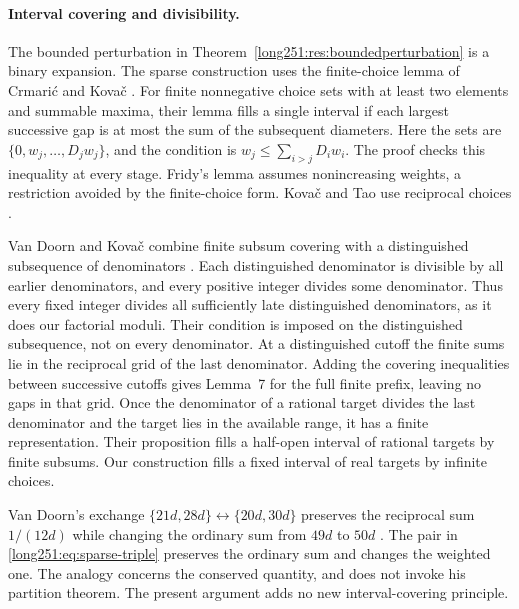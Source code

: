 \paragraph{Interval covering and divisibility.}
The bounded perturbation in Theorem~\ref{long251:res:boundedperturbation}
is a binary expansion.  The sparse construction uses the finite-choice
lemma of Crmari\'{c} and Kova\v{c} \cite[Lemma~4]{crmarickovac2025}.
For finite nonnegative choice sets with at least two elements and
summable maxima, their lemma fills a single interval if each largest
successive gap is at most the sum of the subsequent diameters.
Here the sets are $\{0,w_j,\ldots,D_jw_j\}$, and the condition is
$w_j\le\sum_{i>j}D_iw_i$.  The proof checks this inequality at every
stage.  Fridy's lemma \cite[Lemma, p.~194]{fridy1966} assumes nonincreasing
weights, a restriction avoided by the finite-choice form.
Kova\v{c} and Tao use reciprocal choices
\cite[Lemma~5.1, Theorem~2.5]{kovactao2024}.

Van Doorn and Kova\v{c} combine finite subsum covering with a distinguished
subsequence of denominators \cite[Lemma~7, Proposition~8]{vandoornkovac2025}.
Each distinguished denominator is divisible by all earlier denominators,
and every positive integer divides some denominator.  Thus every fixed
integer divides all sufficiently late distinguished denominators, as it
does our factorial moduli.  Their condition is imposed on the distinguished
subsequence, not on every denominator.  At a distinguished cutoff the
finite sums lie in the reciprocal grid of the last denominator.
Adding the covering inequalities between successive cutoffs gives
Lemma~7 for the full finite prefix, leaving no gaps in that grid.
Once the denominator of a rational target divides the last denominator
and the target lies in the available range, it has a finite representation.
Their proposition fills a half-open interval of rational targets by finite
subsums.  Our construction fills a fixed interval of real targets by
infinite choices.

Van Doorn's exchange
$\{21d,28d\}\leftrightarrow\{20d,30d\}$ preserves the reciprocal sum
$1/(12d)$ while changing the ordinary sum from $49d$ to $50d$
\cite[proof of Theorem~3]{vandoorn2025}.
The pair in \eqref{long251:eq:sparse-triple} preserves the ordinary sum
and changes the weighted one.  The analogy concerns the conserved
quantity, and does not invoke his partition theorem.  The present
argument adds no new interval-covering principle.

